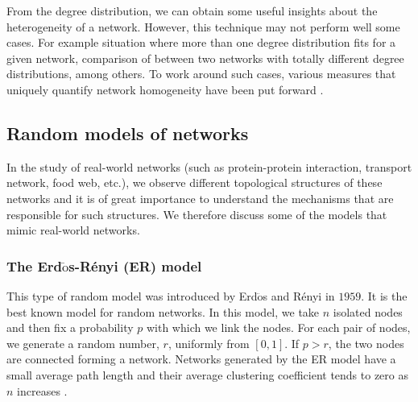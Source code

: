\documentclass[10pt,a4paper]{article}
\theoremstyle{plain}
\theoremstyle{definition}
\begin{document}
From the degree distribution, we can obtain some useful insights about the heterogeneity of a network. However, this technique may not perform well some cases. For example situation where more than one degree distribution fits for a given network, comparison of between two networks with totally different degree distributions, among others. To work around such cases, various measures that uniquely quantify network homogeneity have been put forward \citep{bell1992note,albertson1997irregularity,estrada2010quantifying}. 


\subsection{Random models of networks}
In the study of real-world networks (such as protein-protein interaction, transport network, food web, etc.), we observe different topological structures of these networks and it is of great importance to understand the mechanisms that are responsible for such structures. We therefore discuss some of the models that mimic real-world networks.
\subsubsection{The Erd$\ddot{\text{o}}$s-R\'{e}nyi (ER) model}

This type of random model was introduced by Erd$\ddot{\text{o}}$s and R\'{e}nyi in $1959$. It is the best known model for random networks. In this model, we take $n$ isolated nodes and then fix a probability $p$ with which we link the nodes. For each pair of nodes, we generate a random number, $r$, uniformly from $[0,1]$. If $p>r$, the two nodes are connected forming a network. Networks generated by the ER model have a small average path length and their average clustering coefficient tends to zero as $n$ increases \citep{estrada2011structure}.
\end{document}
